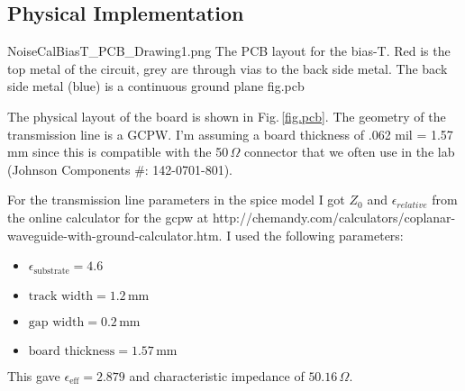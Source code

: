 \begin{comment}
To check how "Microwavy" The board needs to be lets calculate the wavelength at 100 MHz which is roughly the high end of the range that we wish to calibrate.  Since we build the board out of FR4 which has $\epsilon$=4.6 our $\epsilon_{r}$ is (1+4.6)/2 = 2.8 $\epsilon_0$.

In typical operation port 4 of the device is 50 $\Omega$ terminated.

\begin{figure}[ht]
\begin{center}
\begin{circuitikz}
\draw (-1,2)
to [vsourcesin,l=$\text{DAC}$] (0,2);
\draw (-1,0)
to [vsourcesin,l=$\text{Agilent}$] (0,0);
\draw (0,0)
to [TL,l_=$Z_{0}$] (2,0)
to [R=$\text{75 K}\Omega$] (2,2)
to [TL,l_=$Z_{0} \text{=} 50 \Omega$] (0,2);
\draw (2,0)
to [R,l_=$50 \Omega$] (4,0)
to [short] node[ground] {} (5,0);
\draw (2,2)
to [TL,l_=$Z_{0}$] (4,2);
\end{circuitikz}
\end{center}
\end{figure}
\end{comment}

\subsection{Physical Implementation}

\quickfig{\columnwidth}
{NoiseCalBiasT_PCB_Drawing1.png}
{
The PCB layout for the bias-T.
Red is the top metal of the circuit, grey are through vias to the back side metal.
The back side metal (blue) is a continuous ground plane}
{fig.pcb}

The physical layout of the board is shown in Fig.\,\ref{fig.pcb}.
The geometry of the transmission line is a GCPW.
I'm assuming a board thickness of .062 mil = 1.57 mm since this is compatible with the 50\,$\Omega$ connector that we often use in the lab (Johnson Components \#: 142-0701-801).

For the transmission line parameters in the spice model I got $Z_0$ and $\epsilon_{relative}$ from the online calculator for the gcpw at http://chemandy.com/calculators/coplanar-waveguide-with-ground-calculator.htm.
I used the following parameters:
\begin{itemize}
\item $\epsilon_{\text{substrate}} = 4.6$
\item $\text{track width} = 1.2\,\text{mm}$
\item $\text{gap width} = 0.2\,\text{mm}$
\item $\text{board thickness} = 1.57\,\text{mm}$
\end{itemize}
This gave $\epsilon_{\text{eff}} = 2.879$ and characteristic impedance of  $50.16\,\Omega$.

